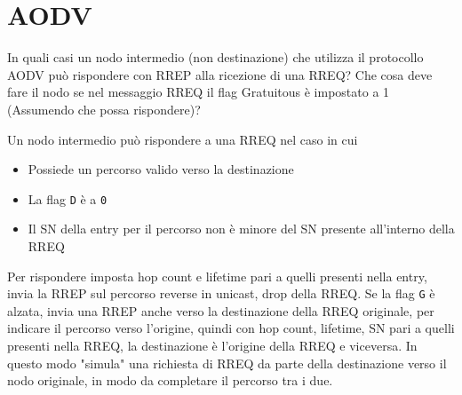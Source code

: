 \section{AODV}

\begin{questions}
    \question In quali casi un nodo intermedio (non destinazione) che utilizza il protocollo AODV può rispondere con RREP alla ricezione di una RREQ? Che cosa deve fare il nodo se nel messaggio RREQ il flag Gratuitous è impostato a 1 (Assumendo che possa rispondere)? 
    
    \begin{solution}
        Un nodo intermedio può rispondere a una RREQ nel caso in cui
        \begin{itemize}
            \item Possiede un percorso valido verso la destinazione
            
            \item La flag \texttt{D} è a \texttt{0}
            
            \item Il SN della entry per il percorso non è minore del SN presente all'interno della RREQ
        \end{itemize}
        
        Per rispondere imposta hop count e lifetime pari a quelli presenti nella entry, invia la RREP sul percorso reverse in unicast, drop della RREQ. Se la flag \texttt{G} è alzata, invia una RREP anche verso la destinazione della RREQ originale, per indicare il percorso verso l'origine, quindi con hop count, lifetime, SN pari a quelli presenti nella RREQ, la destinazione è l'origine della RREQ e viceversa. In questo modo "simula" una richiesta di RREQ da parte della destinazione verso il nodo originale, in modo da completare il percorso tra i due.
    \end{solution}
\end{questions}